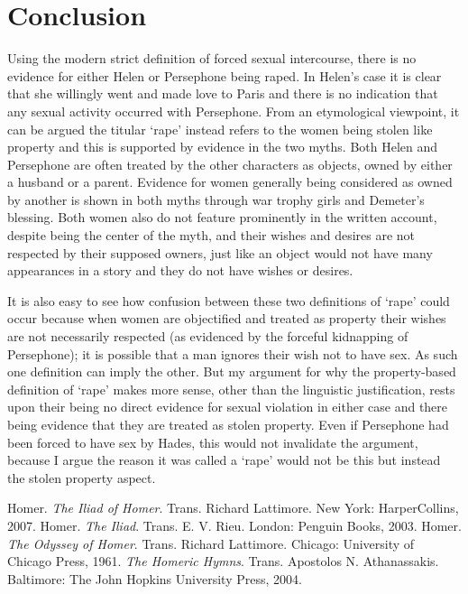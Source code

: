 \documentclass[11pt]{article}
\begin{document}
\section{Conclusion}
Using the modern strict definition of forced sexual intercourse, there is no evidence for either Helen or Persephone being raped.
In Helen's case it is clear that she willingly went and made love to Paris and there is no indication that any sexual activity occurred with Persephone.
From an etymological viewpoint, it can be argued the titular `rape' instead refers to the women being stolen like property and this is supported by evidence in the two myths.
Both Helen and Persephone are often treated by the other characters as objects, owned by either a husband or a parent.
Evidence for women generally being considered as owned by another is shown in both myths through war trophy girls and Demeter's blessing.
Both women also do not feature prominently in the written account, despite being the center of the myth, and their wishes and desires are not respected by their supposed owners, just like an object would not have many appearances in a story and they do not have wishes or desires.

It is also easy to see how confusion between these two definitions of `rape' could occur because when women are objectified and treated as property their wishes are not necessarily respected (as evidenced by the forceful kidnapping of Persephone); it is possible that a man ignores their wish not to have sex.
As such one definition can imply the other.
But my argument for why the property-based definition of `rape' makes more sense, other than the linguistic justification, rests upon their being no direct evidence for sexual violation in either case and there being evidence that they are treated as stolen property.
Even if Persephone had been forced to have sex by Hades, this would not invalidate the argument, because I argue the reason it was called a `rape' would not be this but instead the stolen property aspect.







\newpage
\begin{thebibliography}{9}
        Homer. \emph{The Iliad of Homer}. Trans. Richard Lattimore. New York: HarperCollins, 2007.
		Homer. \emph{The Iliad}. Trans. E. V. Rieu. London: Penguin Books, 2003.
        Homer. \emph{The Odyssey of Homer}. Trans. Richard Lattimore. Chicago: University of Chicago Press, 1961.
        \emph{The Homeric Hymns}. Trans. Apostolos N. Athanassakis. Baltimore: The John Hopkins University Press, 2004.
\end{thebibliography}
\end{document}
